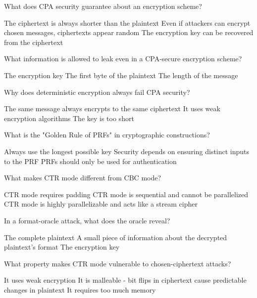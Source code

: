 \documentclass[10pt,a4paper,american]{exam}
\begin{document}
\begin{questions}
	\question What does CPA security guarantee about an encryption scheme?
	\begin{randomizechoices}
		\choice The ciphertext is always shorter than the plaintext
		\CorrectChoice Even if attackers can encrypt chosen messages, ciphertexts appear random
		\choice The encryption key can be recovered from the ciphertext
	\end{randomizechoices}

	\question What information is allowed to leak even in a CPA-secure encryption scheme?
	\begin{randomizechoices}
		\choice The encryption key
		\choice The first byte of the plaintext
		\CorrectChoice The length of the message
	\end{randomizechoices}

	\question Why does deterministic encryption always fail CPA security?
	\begin{randomizechoices}
		\CorrectChoice The same message always encrypts to the same ciphertext
		\choice It uses weak encryption algorithms
		\choice The key is too short
	\end{randomizechoices}

	\question What is the "Golden Rule of PRFs" in cryptographic constructions?
	\begin{randomizechoices}
		\choice Always use the longest possible key
		\CorrectChoice Security depends on ensuring distinct inputs to the PRF
		\choice PRFs should only be used for authentication
	\end{randomizechoices}

	\question What makes CTR mode different from CBC mode?
	\begin{randomizechoices}
		\choice CTR mode requires padding
		\choice CTR mode is sequential and cannot be parallelized
		\CorrectChoice CTR mode is highly parallelizable and acts like a stream cipher
	\end{randomizechoices}

	\question In a format-oracle attack, what does the oracle reveal?
	\begin{randomizechoices}
		\choice The complete plaintext
		\CorrectChoice A small piece of information about the decrypted plaintext's format
		\choice The encryption key
	\end{randomizechoices}

	\question What property makes CTR mode vulnerable to chosen-ciphertext attacks?
	\begin{randomizechoices}
		\choice It uses weak encryption
		\CorrectChoice It is malleable - bit flips in ciphertext cause predictable changes in plaintext
		\choice It requires too much memory
	\end{randomizechoices}


\end{questions}
\end{document}
